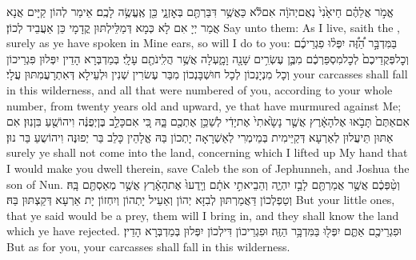 {אֱמֹ֣ר אֲלֵהֶ֗ם חַי\maqqaf אָ֙נִי֙ נְאֻם\maqqaf יְהֹוָ֔ה אִם\maqqaf לֹ֕א כַּאֲשֶׁ֥ר דִּבַּרְתֶּ֖ם בְּאׇזְנָ֑י כֵּ֖ן אֶֽעֱשֶׂ֥ה לָכֶֽם׃}
{אֵימַר לְהוֹן קַיָּים אֲנָא אֲמַר יְיָ אִם לָא כְּמָא דְּמַלֵּילְתּוּן קֳדָמָי כֵּן אַעֲבֵיד לְכוֹן׃}
{Say unto them: As I live, saith the \lord, surely as ye have spoken in Mine ears, so will I do to you:}{}
{בַּמִּדְבָּ֣ר הַ֠זֶּ֠ה יִפְּל֨וּ פִגְרֵיכֶ֜ם וְכׇל\maqqaf פְּקֻדֵיכֶם֙ לְכׇל\maqqaf מִסְפַּרְכֶ֔ם מִבֶּ֛ן עֶשְׂרִ֥ים שָׁנָ֖ה וָמָ֑עְלָה אֲשֶׁ֥ר הֲלִֽינֹתֶ֖ם עָלָֽי׃}
{בְּמַדְבְּרָא הָדֵין יִפְּלוּן פִּגְרֵיכוֹן וְכָל מִנְיָנְכוֹן לְכָל חוּשְׁבָּנְכוֹן מִבַּר עֶשׂרִין שְׁנִין וּלְעֵילָא דְּאִתְרָעֲמִתּוּן עֲלָי׃}
{your carcasses shall fall in this wilderness, and all that were numbered of you, according to your whole number, from twenty years old and upward, ye that have murmured against Me;}{}
{אִם\maqqaf אַתֶּם֙ תָּבֹ֣אוּ אֶל\maqqaf הָאָ֔רֶץ אֲשֶׁ֤ר נָשָׂ֙אתִי֙ אֶת\maqqaf יָדִ֔י לְשַׁכֵּ֥ן אֶתְכֶ֖ם בָּ֑הּ כִּ֚י אִם\maqqaf כָּלֵ֣ב בֶּן\maqqaf יְפֻנֶּ֔ה וִיהוֹשֻׁ֖עַ בִּן\maqqaf נֽוּן׃}
{אִם אַתּוּן תֵּיעֲלוּן לְאַרְעָא דְּקַיֵּימִית בְּמֵימְרִי לְאַשְׁרָאָה יָתְכוֹן בַּהּ אֱלָהֵין כָּלֵב בַּר יְפוּנֶּה וִיהוֹשֻעַ בַּר נוּן׃}
{surely ye shall not come into the land, concerning which I lifted up My hand that I would make you dwell therein, save Caleb the son of Jephunneh, and Joshua the son of Nun.}{}
{וְטַ֨פְּכֶ֔ם אֲשֶׁ֥ר אֲמַרְתֶּ֖ם לָבַ֣ז יִהְיֶ֑ה וְהֵבֵיאתִ֣י אֹתָ֔ם וְיָֽדְעוּ֙ אֶת\maqqaf הָאָ֔רֶץ אֲשֶׁ֥ר מְאַסְתֶּ֖ם בָּֽהּ׃}
{וְטַפְלְכוֹן דַּאֲמַרְתּוּן לְבִזָּא יְהוֹן וְאַעֵיל יָתְהוֹן וְיִחְזוֹן יָת אַרְעָא דְּקַצְתּוּן בַּהּ׃}
{But your little ones, that ye said would be a prey, them will I bring in, and they shall know the land which ye have rejected.}{}
{וּפִגְרֵיכֶ֖ם אַתֶּ֑ם יִפְּל֖וּ בַּמִּדְבָּ֥ר הַזֶּֽה׃}
{וּפִגְרֵיכוֹן דִּילְכוֹן יִפְּלוּן בְּמַדְבְּרָא הָדֵין׃}
{But as for you, your carcasses shall fall in this wilderness.}{}
